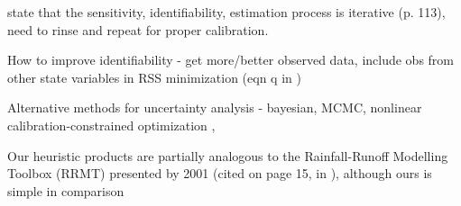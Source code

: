\documentclass[letterpaper,12pt,oneside]{article}\usepackage[]{graphicx}\usepackage[]{color}
\begin{document}
\cite{Omlin01} state that the sensitivity, identifiability, estimation process is iterative (p. 113), need to rinse and repeat for proper calibration. 

How to improve identifiability - get more/better observed data, include obs from other state variables in RSS minimization (eqn q in \cite{Omlin01})

Alternative methods for uncertainty analysis - bayesian, MCMC, nonlinear calibration-constrained optimization \citep{Gallagher07}, \citep{Arhonditsis08}

Our heuristic products are partially analogous to the Rainfall-Runoff Modelling Toolbox (RRMT) presented by \citep{Wagener01b}2001 (cited on page 15, in \citealt{Wagener01}), although ours is simple in comparison

\clearpage
\begin{singlespace}


\end{singlespace}
\clearpage

\end{document}
